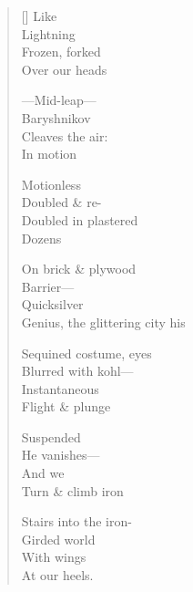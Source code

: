 \label{ch:appearance}
\settowidth{\versewidth}{            Genius, the glittering city his}
\begin{verse}[\versewidth]
                          Like\\
                 Lightning\\
Frozen, forked\\
                 Over our heads

---Mid-leap---\\
           Baryshnikov\\
                 Cleaves the air:\\
     In motion

Motionless\\
Doubled \& re-\\
Doubled in plastered\\
Dozens

On brick \& plywood\\
Barrier---\\
                Quicksilver\\
            Genius, the glittering city his

Sequined costume, eyes\\
         Blurred with kohl---\\
               Instantaneous\\
Flight \& plunge

            Suspended\\
He vanishes---\\
                            And we\\
Turn \& climb iron

Stairs into the iron-\\
Girded world\\
With wings\\
At our heels.
\end{verse}
